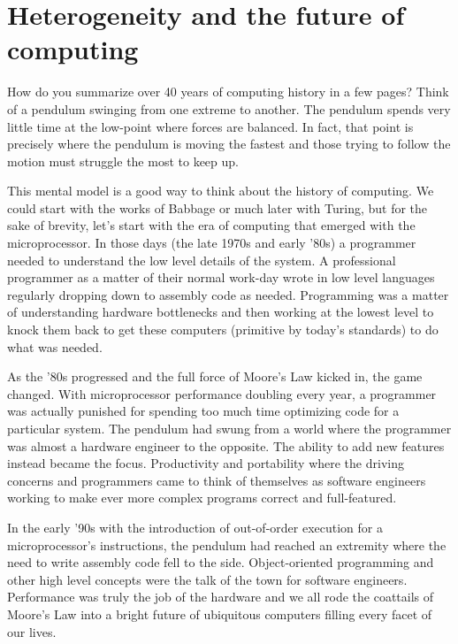 
\def\ArtDir{01.HeteroComp/figures}%

\chapter{Heterogeneity and the future of computing}
\label{chapter:heterogeneity}

How do you summarize over 40 years of computing history in a few pages?   
Think of a pendulum swinging from one extreme to another.  The pendulum spends very little time at
the low-point where forces are balanced.  In fact, that point is precisely where the pendulum is
moving the fastest and those trying to follow the motion must struggle the most  to keep up.

This mental model is a good way to think about the history of computing.  We could start with the
works of Babbage or much later with Turing, but for the sake of brevity, let's start with the era of computing
that emerged with the microprocessor.  In those days (the late 1970s and early '80s) a programmer
needed to understand the low level details of the system.  A professional programmer as a matter
of their normal work-day wrote in low level languages regularly dropping down to assembly code 
as needed.   Programming was a matter of understanding hardware bottlenecks and then working at the lowest 
level to knock them back to get these computers (primitive by today's standards) to do what was needed.

As the '80s progressed and the full force of Moore's Law kicked in, the game changed.   With
microprocessor performance doubling every year, a programmer was actually punished for 
spending too much time optimizing code for a particular system.  The pendulum had swung from
a world where the programmer was almost a hardware engineer to the opposite.  The ability to 
add new features instead became the focus.  Productivity and portability where the driving concerns and
programmers came to think of themselves as software engineers working to make ever more
complex programs correct and full-featured.

In the early '90s with the introduction of out-of-order execution for a microprocessor's instructions, the 
pendulum had reached an extremity where the need to write assembly code fell to the side.  Object-oriented
programming and other high level concepts were the talk of the town for software engineers.  Performance was
truly the job of the hardware and we all rode the coattails of Moore's Law into a bright future of
ubiquitous computers filling every facet of our lives.

